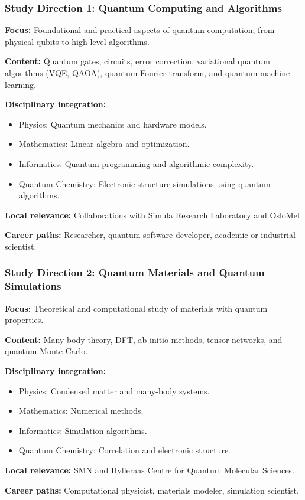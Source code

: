 \documentclass{beamer}
\begin{document}
\begin{frame}
\frametitle{Study Direction 1: Quantum Computing and Algorithms}
\textbf{Focus:} Foundational and practical aspects of quantum computation, from physical qubits to high-level algorithms.

\textbf{Content:} Quantum gates, circuits, error correction, variational quantum algorithms (VQE, QAOA), quantum Fourier transform, and quantum machine learning.

\textbf{Disciplinary integration:}
\begin{itemize}
    \item Physics: Quantum mechanics and hardware models.
    \item Mathematics: Linear algebra and optimization.
    \item Informatics: Quantum programming and algorithmic complexity.
    \item Quantum Chemistry: Electronic structure simulations using quantum algorithms.
\end{itemize}

\textbf{Local relevance:} Collaborations with Simula Research Laboratory and OsloMet

\textbf{Career paths:} Researcher, quantum software developer, academic or industrial scientist.

\end{frame}


\begin{frame}
\frametitle{Study Direction 2: Quantum Materials and Quantum Simulations}
\textbf{Focus:} Theoretical and computational study of materials with quantum properties.

\textbf{Content:} Many-body theory, DFT, ab-initio methods, tensor networks, and quantum Monte Carlo.

\textbf{Disciplinary integration:}
\begin{itemize}
    \item Physics: Condensed matter and many-body systems.
    \item Mathematics: Numerical methods.
    \item Informatics: Simulation algorithms.
    \item Quantum Chemistry: Correlation and electronic structure.
\end{itemize}

\textbf{Local relevance:} SMN and Hylleraas Centre for Quantum Molecular Sciences.

\textbf{Career paths:} Computational physicist, materials modeler, simulation scientist.

\end{frame}
\end{document}
